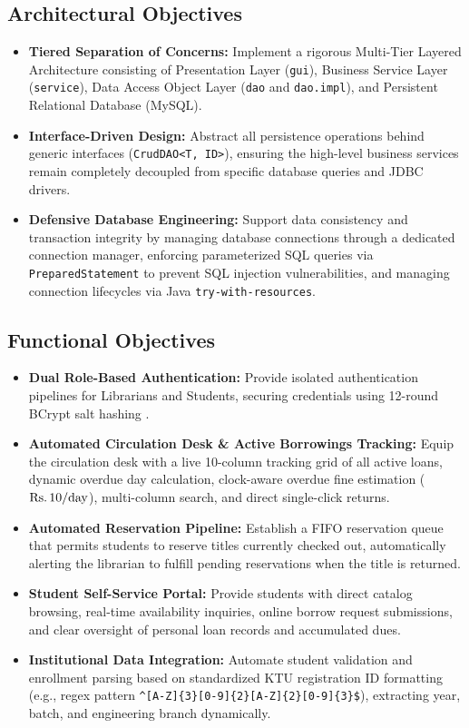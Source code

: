 \subsection{Architectural Objectives}
\begin{itemize}
    \item \textbf{Tiered Separation of Concerns:} Implement a rigorous Multi-Tier Layered Architecture consisting of Presentation Layer (\texttt{gui}), Business Service Layer (\texttt{service}), Data Access Object Layer (\texttt{dao} and \texttt{dao.impl}), and Persistent Relational Database (MySQL).
    \item \textbf{Interface-Driven Design:} Abstract all persistence operations behind generic interfaces (\texttt{CrudDAO<T, ID>}), ensuring the high-level business services remain completely decoupled from specific database queries and JDBC drivers.
    \item \textbf{Defensive Database Engineering:} Support data consistency and transaction integrity by managing database connections through a dedicated connection manager, enforcing parameterized SQL queries via \texttt{PreparedStatement} to prevent SQL injection vulnerabilities, and managing connection lifecycles via Java \texttt{try-with-resources}.
\end{itemize}

\subsection{Functional Objectives}
\begin{itemize}
    \item \textbf{Dual Role-Based Authentication:} Provide isolated authentication pipelines for Librarians and Students, securing credentials using 12-round BCrypt salt hashing \cite{miller2020jbcrypt,provos1999bcrypt}.
    \item \textbf{Automated Circulation Desk \& Active Borrowings Tracking:} Equip the circulation desk with a live 10-column tracking grid of all active loans, dynamic overdue day calculation, clock-aware overdue fine estimation ($\text{\text{Rs.\,}} 10/\text{day}$), multi-column search, and direct single-click returns.
    \item \textbf{Automated Reservation Pipeline:} Establish a FIFO reservation queue that permits students to reserve titles currently checked out, automatically alerting the librarian to fulfill pending reservations when the title is returned.
    \item \textbf{Student Self-Service Portal:} Provide students with direct catalog browsing, real-time availability inquiries, online borrow request submissions, and clear oversight of personal loan records and accumulated dues.
    \item \textbf{Institutional Data Integration:} Automate student validation and enrollment parsing based on standardized KTU registration ID formatting (e.g., regex pattern \texttt{\^{}[A-Z]\{3\}[0-9]\{2\}[A-Z]\{2\}[0-9]\{3\}\$}), extracting year, batch, and engineering branch dynamically.
\end{itemize}

